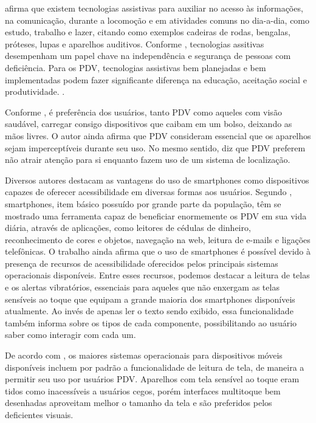 \documentclass[english,brazilian]{UNISINOSmonografia}
\begin{document}
 afirma que existem tecnologias assistivas para auxiliar no acesso às informações, na comunicação, durante a locomoção e em atividades comuns no dia-a-dia, como estudo, trabalho e lazer, citando como exemplos cadeiras de rodas, bengalas, próteses, lupas e aparelhos auditivos. Conforme , tecnologias assitivas desempenham um papel chave na independência e segurança de pessoas com deficiência. Para os PDV, tecnologias assistivas bem planejadas e bem implementadas podem fazer significante diferença na educação, aceitação social e produtividade. \cite{dias2015navpal}.

Conforme , é preferência dos usuários, tanto PDV como aqueles com visão saudável, carregar consigo dispositivos que caibam em um bolso, deixando as mãos livres. O autor ainda afirma que PDV consideram essencial que os aparelhos sejam imperceptíveis durante seu uso. No mesmo sentido,  diz que PDV preferem não atrair atenção para si enquanto fazem uso de um sistema de localização.

Diversos autores destacam as vantagens do uso de smartphones como dispositivos capazes de oferecer acessibilidade em diversas formas aos usuários. Segundo , smartphones, item básico possuído por grande parte da população, têm se mostrado uma ferramenta capaz de beneficiar enormemente os PDV em sua vida diária, através de aplicações, como leitores de cédulas de dinheiro, reconhecimento de cores e objetos, navegação na web, leitura de e-mails e ligações telefônicas. O trabalho ainda afirma que o uso de smartphones é possível devido à presença de recursos de acessibilidade oferecidos pelos principais sistemas operacionais disponíveis. Entre esses recursos, podemos destacar a leitura de telas e os alertas vibratórios, essenciais para aqueles que não enxergam as telas sensíveis ao toque que equipam a grande maioria dos smartphones disponíveis atualmente. Ao invés de apenas ler o texto sendo exibido, essa funcionalidade também informa sobre os tipos de cada componente, possibilitando ao usuário saber como interagir com cada um.

De acordo com , os maiores sistemas operacionais para dispositivos móveis disponíveis incluem por padrão a funcionalidade de leitura de tela, de maneira a permitir seu uso por usuários PDV. Aparelhos com tela sensível ao toque eram tidos como inacessíveis a usuários cegos, porém interfaces multitoque bem desenhadas aproveitam melhor o tamanho da tela e são preferidos pelos deficientes visuais.
\end{document}
